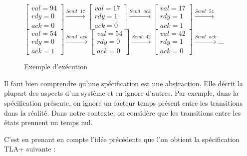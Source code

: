 \documentclass[12pt,a4paper]{article}
\begin{document}
\begin{figure}[ht]
	\begin{center}
		$\begin{bmatrix}
			val = 94 \\
			rdy = 0 \\
			ack = 0 
		\end{bmatrix}
		\xrightarrow{Send \text{ } 17}
		\begin{bmatrix}
			val = 17 \\
			rdy = 1 \\
			ack = 0 
		\end{bmatrix}
		\xrightarrow{Send \text{ } ack}
		\begin{bmatrix}
			val = 17 \\
			rdy = 1 \\
			ack = 1 
		\end{bmatrix}
		\xrightarrow{Send \text{ } 54}
		$\vspace{0.5cm}
		$		
		\begin{bmatrix}
			val = 54 \\
			rdy = 0 \\
			ack = 1 
		\end{bmatrix}
		\xrightarrow{Send \text{ } ack}
		\begin{bmatrix}
			val = 54 \\
			rdy = 0 \\
			ack = 0 
		\end{bmatrix}
		\xrightarrow{Send \text{ } 42}
		\begin{bmatrix}
			val = 42 \\
			rdy = 1 \\
			ack = 0 
		\end{bmatrix}
		\xrightarrow{Send \text{ } ack} ...$
	\end{center}
	\caption{Exemple d'exécution}
\end{figure}

Il faut bien comprendre qu'une spécification est une abstraction. Elle décrit la plupart des aspects d'un système et en ignore d'autres. Par exemple, dans la spécification présente,  on ignore un facteur temps présent entre les transitions dans la réalité. Dans notre contexte, on considère que les transitions entre les états prennent un temps nul.

C'est en prenant en compte l'idée précédente que l'on obtient la spécification TLA+ suivante :
\end{document}
